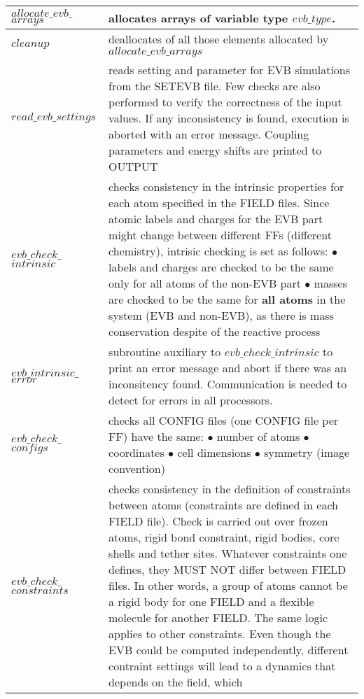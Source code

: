 \begin{center}
\begin{longtable*}[t]{p{0.15\textwidth}|p{0.85\textwidth}}
\hline 
$allocate\_evb\_$ $arrays$ & allocates arrays of variable type $evb\_type$.  \\
\hline 
$cleanup$ & deallocates of all those elements allocated by $allocate\_evb\_arrays$ \\
\hline 
$read\_evb\_settings$ &  reads setting and parameter for EVB simulations
 from the SETEVB file. Few checks are also performed to verify
 the correctness of the input values. If any inconsistency is found,
 execution is aborted with an error message. Coupling parameters
 and energy shifts are printed to OUTPUT
\\
\hline 
$evb\_check\_$ $intrinsic$ & checks consistency in the intrinsic properties for
each atom specified in the FIELD files. Since atomic labels and charges for the EVB part
might change between different FFs (different chemistry), intrisic checking is set as follows:\newline
$\bullet$ labels and charges are checked to be the same only for all atoms of the non-EVB part\newline
$\bullet$ masses are checked to be the same for {\bf all atoms} in the system (EVB and non-EVB), as there is mass conservation despite of the reactive process\\
\hline 
$evb\_intrinsic\_$ $error$ & subroutine auxiliary to $evb\_check\_intrinsic$ to print an
error message and abort if there was an inconsitency found. Communication is needed to detect for errors in all processors.\\
\hline 
$evb\_check\_$ $configs$ & checks all CONFIG files (one CONFIG file per FF) have the same:\newline
$\bullet$ number of atoms\newline
$\bullet$ coordinates\newline
$\bullet$ cell dimensions\newline
$\bullet$ symmetry (image convention)\\
\hline 
$evb\_check\_$ $constraints$ & checks consistency in the definition of constraints
between atoms (constraints are defined in each FIELD file).
Check is carried out over frozen atoms, rigid bond constraint, rigid bodies,
core shells and tether sites.\newline
Whatever constraints one defines, they MUST NOT differ between FIELD files.
In other words, a group of atoms cannot be a rigid body for one FIELD
and a flexible molecule for another FIELD. The same logic applies to other
constraints. Even though the EVB could be computed independently, different
contraint settings will lead to a dynamics that depends on the field, which

\end{longtable*}
\end{center}
